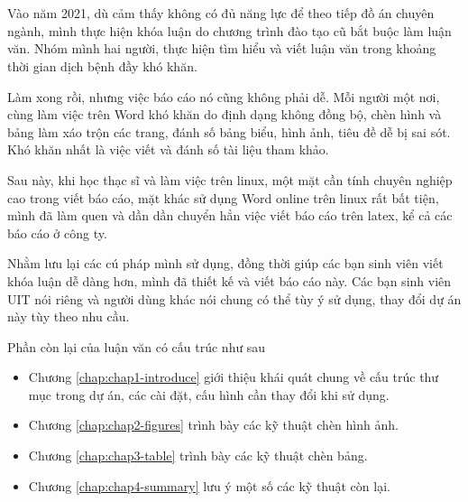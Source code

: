 \chapter*{}

Vào năm 2021, dù cảm thấy không có đủ năng lực để theo tiếp đồ án chuyên ngành, mình thực hiện khóa luận do chương trình đào tạo cũ bắt buộc làm luận văn. Nhóm mình hai người, thực hiện tìm hiểu và viết luận văn trong khoảng thời gian dịch bệnh đầy khó khăn.

Làm xong rồi, nhưng việc báo cáo nó cũng không phải dễ. Mỗi người một nơi, cùng làm việc trên Word khó khăn do định dạng không đồng bộ, chèn hình và bảng làm xáo trộn các trang, đánh số bảng biểu, hình ảnh, tiêu đề dễ bị sai sót. Khó khăn nhất là việc viết và đánh số tài liệu tham khảo.

Sau này, khi học thạc sĩ và làm việc trên linux, một mặt cần tính chuyên nghiệp cao trong viết báo cáo, mặt khác sử dụng Word online trên linux rất bất tiện, mình đã làm quen và dần dần chuyển hẳn việc viết báo cáo trên latex, kể cả các báo cáo ở công ty.

Nhằm lưu lại các cú pháp mình sử dụng, đồng thời giúp các bạn sinh viên viết khóa luận dễ dàng hơn, mình đã thiết kế và viết báo cáo này. Các bạn sinh viên UIT nói riêng và người dùng khác nói chung có thể tùy ý sử dụng, thay đổi dự án này tùy theo nhu cầu.

Phần còn lại của luận văn có cấu trúc như sau
\begin{itemize}
    \item Chương \ref{chap:chap1-introduce} giới thiệu khái quát chung về cấu trúc thư mục trong dự án, các cài đặt, cấu hình cần thay đổi khi sử dụng.
    \item Chương \ref{chap:chap2-figures} trình bày các kỹ thuật chèn hình ảnh.
    \item Chương \ref{chap:chap3-table} trình bày các kỹ thuật chèn bảng.
    \item Chương \ref{chap:chap4-summary} lưu ý một số các kỹ thuật còn lại.
\end{itemize}